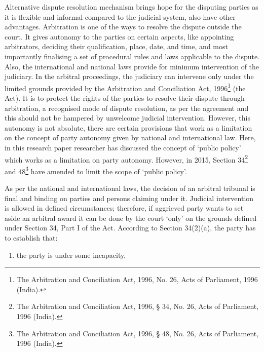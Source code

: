 \begin{multicols}{2}
\noi
Alternative dispute resolution mechanism brings hope for the disputing parties as it is flexible
and informal compared to the judicial system, also have other advantages. Arbitration is one
of the ways to resolve the dispute outside the court. It gives autonomy to the parties on certain
aspects, like appointing arbitrators, deciding their qualification, place, date, and time, and most
importantly finalising a set of procedural rules and laws applicable to the dispute. Also, the
international and national laws provide for minimum intervention of the judiciary. In the
arbitral proceedings, the judiciary can intervene only under the limited grounds provided by
the Arbitration and Conciliation Act, 1996\footnote{The Arbitration and Conciliation Act, 1996, No. 26, Acts of Parliament, 1996 (India).}  (the Act). It is to protect the rights of the parties
to resolve their dispute through arbitration, a recognised mode of dispute resolution, as per the
agreement and this should not be hampered by unwelcome judicial intervention. However,
this autonomy is not absolute, there are certain provisions that work as a limitation on the
concept of party autonomy given by national and international law. Here, in this research paper
researcher has discussed the concept of ‘public policy’ which works as a limitation on party
autonomy. However, in 2015, Section 34\footnote{The Arbitration and Conciliation Act, 1996, § 34, No. 26, Acts of Parliament, 1996 (India).} and 48\footnote{The Arbitration and Conciliation Act, 1996, § 48, No. 26, Acts of Parliament, 1996 (India).} have amended to limit the scope of ‘public policy’.

\vspace{-.1cm}


\vspace{-.1cm}

\noi
As per the national and international laws, the decision of an arbitral tribunal is final and
binding on parties and persons claiming under it. Judicial intervention is allowed in defined
circumstances; therefore, if aggrieved party wants to set aside an arbitral award it can be done
by the court ‘only’ on the grounds defined under Section 34, Part I of the Act. According to
Section 34(2)(a), the party has to establish that:

\vspace{-.4cm}

\begin{enumerate}[label=$\alph*.$]
\itemsep=0pt
\item the party is under some incapacity,


\end{enumerate}
\end{multicols}
